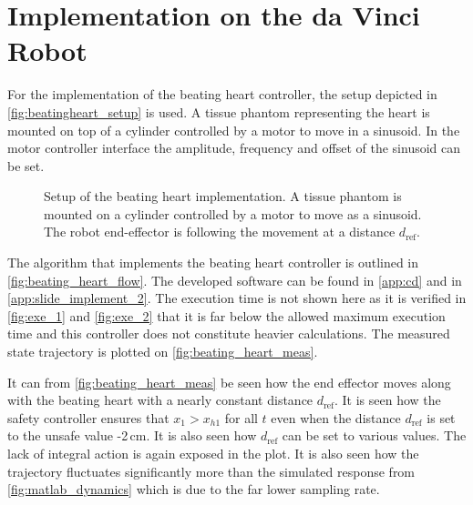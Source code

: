 \vspace{-0.2cm}
\section{Implementation on the da Vinci Robot}
\vspace{-0.2cm}

For the implementation of the beating heart controller, the setup depicted in \autoref{fig:beatingheart_setup} is used. A tissue phantom representing the heart is mounted on top of a cylinder controlled by a motor to move in a sinusoid. In the motor controller interface the amplitude, frequency and offset of the sinusoid can be set.%
\begin{figure}[h]
	\centering
	\hspace{2mm}
	\hspace{2mm}
	\hspace{2mm}
	\caption{Setup of the beating heart implementation. A tissue phantom is mounted on a cylinder controlled by a motor to move as a sinusoid. The robot end-effector is following the movement at a distance $d_\text{ref}$.}
	\label{fig:beatingheart_setup}
\end{figure}

The algorithm that implements the beating heart controller is outlined in \autoref{fig:beating_heart_flow}. The developed software can be found in \autoref{app:cd} and in \autoref{app:slide_implement_2}.
The execution time is not shown here as it is verified in \autoref{fig:exe_1} and \autoref{fig:exe_2} that it is far below the allowed maximum execution time and this controller does not constitute heavier calculations. The measured state trajectory is plotted on \autoref{fig:beating_heart_meas}.%


It can from \autoref{fig:beating_heart_meas} be seen how the end effector moves along with the beating heart with a nearly constant distance $d_\text{ref}$. It is seen how the safety controller ensures that $x_1 > x_{h1}$ for all $t$ even when the distance $d_\text{ref}$ is set to the unsafe value -2\,cm. It is also seen how $d_\text{ref}$ can be set to various values. The lack of integral action is again exposed in the plot. It is also seen how the trajectory fluctuates significantly more than the simulated response from \autoref{fig:matlab_dynamics} which is due to the far lower sampling rate.

